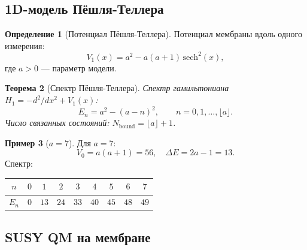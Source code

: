 \documentclass[11pt,a4paper]{article}
\newtheorem{theorem}{Теорема}[section]
\theoremstyle{definition}
\newtheorem{definition}[theorem]{Определение}
\newtheorem{example}[theorem]{Пример}
\begin{document}
\subsection{1D-модель Пёшля-Теллера}

\begin{definition}[Потенциал Пёшля-Теллера]
\label{def:membrane-pt-review}
Потенциал мембраны вдоль одного измерения:
\begin{equation}
    \boxed{
    V_1(x) = a^2 - a(a+1) \, \mathrm{sech}^2(x),
    }
    \label{eq:membrane-V1-review}
\end{equation}
где $a > 0$ — параметр модели.
\end{definition}

\begin{theorem}[Спектр Пёшля-Теллера]
\label{thm:membrane-spectrum-review}
Спектр гамильтониана $H_1 = -d^2/dx^2 + V_1(x)$:
\begin{equation}
    \boxed{
    E_n = a^2 - (a - n)^2, \qquad n = 0, 1, \ldots, \lfloor a \rfloor.
    }
    \label{eq:membrane-spectrum-review}
\end{equation}
Число связанных состояний: $N_{\text{bound}} = \lfloor a \rfloor + 1$.
\end{theorem}

\begin{example}[$a = 7$]
Для $a = 7$:
\begin{equation}
    V_0 = a(a+1) = 56, \quad \Delta E = 2a - 1 = 13.
\end{equation}
Спектр:
\begin{center}
\begin{tabular}{c|cccccccc}
\toprule
$n$ & $0$ & $1$ & $2$ & $3$ & $4$ & $5$ & $6$ & $7$ \\
\midrule
$E_n$ & $0$ & $13$ & $24$ & $33$ & $40$ & $45$ & $48$ & $49$ \\
\bottomrule
\end{tabular}
\end{center}
\end{example}

\subsection{SUSY QM на мембране}
\end{document}
